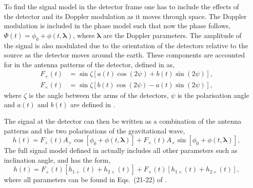 To find the signal model in the detector frame one has to include the effects of the detector and its Doppler modulation as it moves through space. 
The Doppler modulation is included in the phase model such that now the phase follows, $\Phi(t) = \phi_0 + \phi(t, {\boldsymbol \lambda})$, where ${\boldsymbol \lambda}$ are the Doppler parameters. 
The amplitude of the signal is also modulated due to the orientation of the detectors relative to the source as the detector moves around the earth. These components are accounted for in the antenna patterns of the detector, defined in \cite{JKS1998} as,
\begin{equation}
\begin{split}
F_{+}(t) &= \sin{\zeta}[a(t)\cos{(2\psi)} + b(t)\sin{(2\psi)}], \\
F_{\times}(t) &= \sin{\zeta}[b(t) \cos{(2\psi)} - a(t)\sin{(2\psi)}],
\end{split}
\end{equation}
where $\zeta$ is the angle between the arms of the detectors, $\psi$ is the polarisation angle and $a(t)$ and $b(t)$ are defined in \cite{JKS1998}. 

The signal at the detector can then be written as a combination of the antenna patterns and the two polarisations of the gravitational wave,
\begin{equation}
h(t) = F_+(t)A_+\cos{[\phi_0 + \phi(t,{\boldsymbol \lambda})]} +F_{\times}(t)A_{\times}\sin{[\phi_0 + \phi(t,{\boldsymbol \lambda})]},
\end{equation}
The full signal model defined in \cite{JKS1998} actually includes all other parameters such as inclination angle, and has the form,
\begin{equation}
\label{sigmod}
h(t) = F_{+}(t)[h_{1+}(t) + h_{2+}(t)] + F_{\times}(t)[h_{1\times}(t) + h_{2\times}(t)],
\end{equation}
where all parameters can be found in Eqs.~(21-22) of \cite{JKS1998}. 


